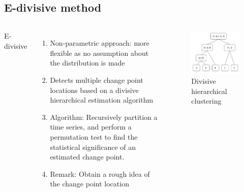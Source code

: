 \documentclass{beamer}
\begin{document}
\subsection{E-divisive method}
\begin{frame}

\begin{columns}[c] %

E-divisive \cite{p3}
\begin{enumerate}
	\item Non-parametric approach: more flexible as no assumption about the distribution is made
	\item Detects multiple change point locations based on a divisive hierarchical estimation algorithm
	\item Algorithm: Recursively partition a time series, and perform a permutation test to find the statistical significance of an estimated change point.
	\item Remark: Obtain a rough idea of the change point location 
\end{enumerate}

\begin{figure}
	\includegraphics[width=1\linewidth]{divisive}
	\caption{Divisive hierarchical clustering}
\end{figure}

\end{columns}

\end{frame}
\end{document}
